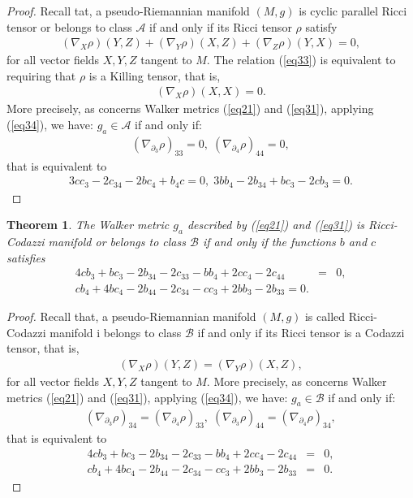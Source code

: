 \documentclass[reqno, 12pt]{amsart}
\numberwithin{equation}{section}
\newtheorem{theorem}{Theorem}[section]
\begin{document}
\begin{proof}
Recall tat, a pseudo-Riemannian manifold $(M,g)$ is cyclic parallel Ricci tensor or belongs to class $\mathcal{A}$ if and only if its Ricci tensor 
$\rho$ satisfy
\begin{eqnarray}\label{eq33}
(\nabla_X \rho)(Y,Z) + (\nabla_Y \rho)(X,Z)+(\nabla_Z \rho)(Y,X) = 0,
\end{eqnarray}
 for all vector fields $X, Y,Z$ tangent to $M$. The relation (\ref{eq33}) is equivalent to requiring that $\rho$ is a Killing tensor, that is,
\begin{eqnarray}\label{eq34}
(\nabla_X \rho)(X,X)=0.
\end{eqnarray}
More precisely, as concerns Walker metrics (\ref{eq21}) and
(\ref{eq31}), applying (\ref{eq34}), we have: $g_a\in \mathcal{A}$ if 
and only if:
\begin{eqnarray*}
(\nabla_{\partial_3}\rho)_{33} = 0 , \; 
(\nabla_{\partial_4}\rho)_{44} = 0,
  \end{eqnarray*}
 that is equivalent to 
 \begin{eqnarray*}
 3cc_3 - 2c_{34} - 2bc_4 + b_4c = 0,\;
3bb_4 - 2b_{34} + bc_3 - 2cb_3 = 0.
 \end{eqnarray*}
\end{proof}

\begin{theorem}
The Walker metric $g_a$ described by (\ref{eq21}) and (\ref{eq31})
is Ricci-Codazzi manifold or belongs to class $\mathcal{B}$ if and only 
if the functions $b$ and $c$ satisfies
\begin{eqnarray*}
4cb_3 + bc_3 - 2b_{34} - 2c_{33} - bb_4 + 2cc_4 - 2c_{44} &=& 0,\\
cb_4 + 4bc_4 - 2b_{44} - 2c_{34} - cc_3 + 2bb_3 - 2b_{33}=0.
\end{eqnarray*}
\end{theorem}

\begin{proof}
Recall that, a pseudo-Riemannian manifold $(M,g)$ is called Ricci-Codazzi manifold i belongs to class $\mathcal{B}$ if and only if its Ricci tensor 
is a Codazzi tensor, that is,
\begin{eqnarray}\label{eq35}
(\nabla_X \rho)(Y,Z) = (\nabla_Y \rho)(X,Z),
\end{eqnarray}
for all vector fields $X, Y,Z$ tangent to $M$. More precisely, as concerns Walker metrics (\ref{eq21}) and (\ref{eq31}), applying (\ref{eq34}), we 
have: $g_a\in \mathcal{B}$ if and only if:
 \begin{eqnarray*}
(\nabla_{\partial_3}\rho)_{34} = (\nabla_{\partial_4}\rho)_{33} , \; 
(\nabla_{\partial_3}\rho)_{44} = (\nabla_{\partial_4}\rho)_{34}, 
\end{eqnarray*}
that is equivalent to
\begin{eqnarray*}
4cb_3 + bc_{3} - 2b_{34} - 2c_{33} - bb_4 + 2cc_4 - 2c_{44} &=& 0, \\   
cb_4 + 4bc_4 - 2b_{44} - 2c_{34} - cc_3 + 2bb_3 - 2b_{33} &=& 0. 
\end{eqnarray*}
\end{proof}
\end{document}
